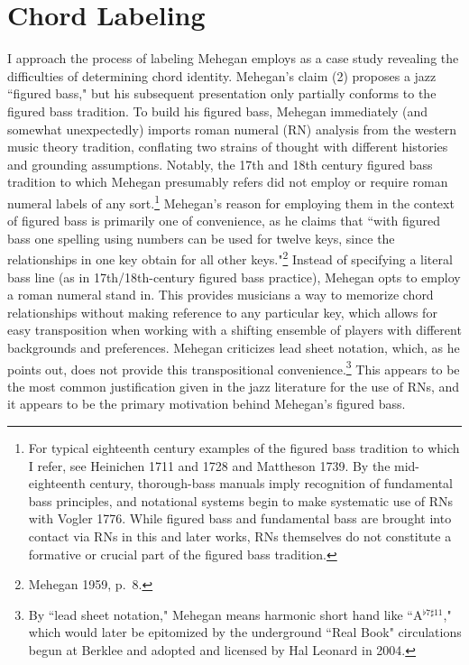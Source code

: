 \section{Chord Labeling}
I approach the process of labeling Mehegan employs as a case study revealing the difficulties of determining chord identity.  Mehegan's claim (2) proposes a jazz ``figured bass," but his subsequent presentation only partially conforms to the figured bass tradition.  To build his figured bass, Mehegan immediately (and somewhat unexpectedly) imports roman numeral (RN) analysis from the western music theory tradition, conflating two strains of thought with different histories and grounding assumptions.  Notably, the 17th and 18th century figured bass tradition to which Mehegan presumably refers did not employ or require roman numeral labels of any sort.\footnote{For typical eighteenth century examples of the figured bass tradition to which I refer, see Heinichen 1711 and 1728 and Mattheson 1739.  By the mid-eighteenth century, thorough-bass manuals imply recognition of fundamental bass principles, and notational systems begin to make systematic use of RNs with Vogler 1776.  While figured bass and fundamental bass are brought into contact via RNs in this and later works, RNs themselves do not constitute a formative or crucial part of the figured bass tradition.}  Mehegan's reason for employing them in the context of figured bass is primarily one of convenience, as he claims that ``with figured bass one spelling using numbers can be used for twelve keys, since the relationships in one key obtain  for all other keys."\footnote{Mehegan 1959, p.\ 8.}  Instead of specifying a literal bass line (as in 17th/18th-century figured bass practice), Mehegan opts to employ a roman numeral stand in.  This provides musicians a way to memorize chord relationships without making reference to any particular key, which allows for easy transposition when working with a shifting ensemble of players with different backgrounds and preferences.  Mehegan criticizes lead sheet notation, which, as he points out, does not provide this transpositional convenience.\footnote{By ``lead sheet notation," Mehegan means harmonic short hand like ``A$^{\flat 7 \sharp 11}$," which would later be epitomized by the underground ``Real Book" circulations begun at Berklee and adopted and licensed by Hal Leonard in 2004.}  This appears to be the most common justification given in the jazz literature for the use of RNs, and it appears to be the primary motivation behind Mehegan's figured bass.

